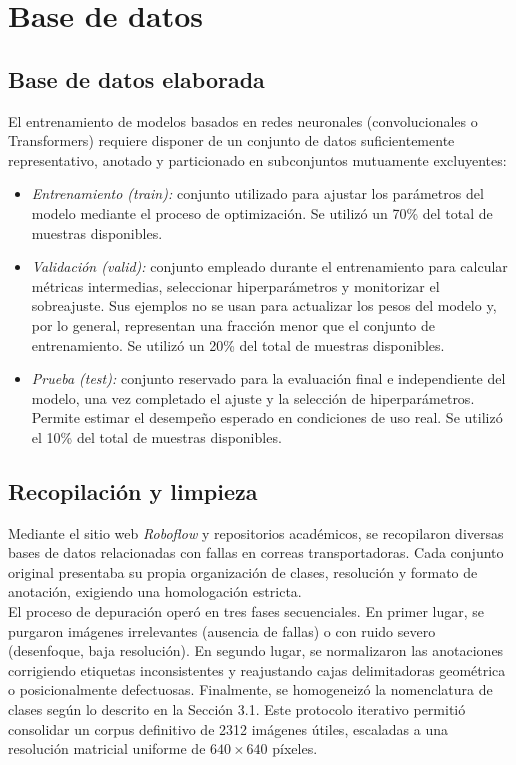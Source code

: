 \section{Base de datos}

\subsection{Base de datos elaborada}

El entrenamiento de modelos basados en redes neuronales (convolucionales o Transformers) requiere disponer de un conjunto de datos suficientemente representativo, anotado y particionado en subconjuntos mutuamente excluyentes:

\begin{itemize}
    \item \textit{Entrenamiento (train):} conjunto utilizado para ajustar los parámetros del modelo mediante el proceso de optimización. Se utilizó un 70\% del total de muestras disponibles.
    \item \textit{Validación (valid):} conjunto empleado durante el entrenamiento para calcular métricas intermedias, seleccionar hiperparámetros y monitorizar el sobreajuste. Sus ejemplos no se usan para actualizar los pesos del modelo y, por lo general, representan una fracción menor que el conjunto de entrenamiento. Se utilizó un 20\% del total de muestras disponibles.
    \item \textit{Prueba (test):} conjunto reservado para la evaluación final e independiente del modelo, una vez completado el ajuste y la selección de hiperparámetros. Permite estimar el desempeño esperado en condiciones de uso real. Se utilizó el 10\% del total de muestras disponibles.
\end{itemize}

\subsection{Recopilación y limpieza}

Mediante el sitio web \textit{Roboflow} y repositorios académicos, se recopilaron diversas bases de datos relacionadas con fallas en correas transportadoras. Cada conjunto original presentaba su propia organización de clases, resolución y formato de anotación, exigiendo una homologación estricta.\\

El proceso de depuración operó en tres fases secuenciales. En primer lugar, se purgaron imágenes irrelevantes (ausencia de fallas) o con ruido severo (desenfoque, baja resolución). En segundo lugar, se normalizaron las anotaciones corrigiendo etiquetas inconsistentes y reajustando cajas delimitadoras geométrica o posicionalmente defectuosas. Finalmente, se homogeneizó la nomenclatura de clases según lo descrito en la Sección 3.1. Este protocolo iterativo permitió consolidar un corpus definitivo de 2312 imágenes útiles, escaladas a una resolución matricial uniforme de $640\times640$ píxeles.\\

